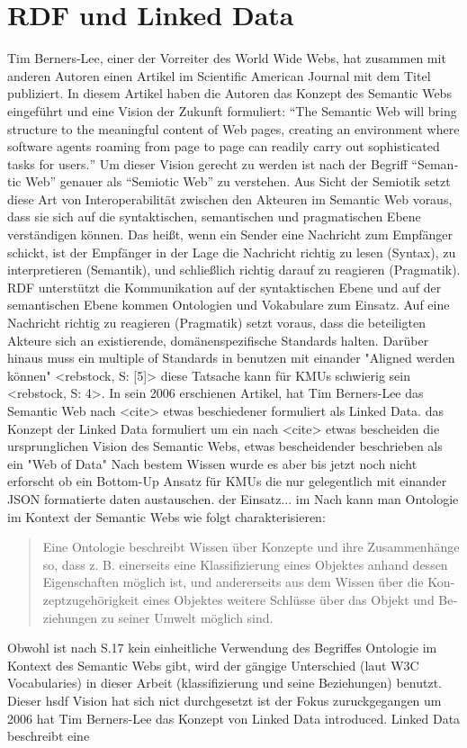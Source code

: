 \section{RDF und Linked Data}
\label{sec:linked-data}

Tim Berners-Lee, einer der Vorreiter des World Wide Webs, hat zusammen mit anderen Autoren \citeyear{berners2001semantic} einen Artikel im Scientific American Journal mit dem Titel  publiziert. In diesem Artikel haben die Autoren das Konzept des Semantic Webs eingeführt und eine Vision der Zukunft formuliert: \hyphenquote{german}{The Semantic Web will bring structure to the meaningful content of Web pages, creating an environment where software agents roaming from page to page can readily carry out sophisticated tasks for users.} Um dieser Vision gerecht zu werden ist nach \citeauthor{blumauer2006semantic} der Begriff \hyphenquote{german}{Semantic Web} genauer als \hyphenquote{german}{Semiotic Web} zu verstehen. Aus Sicht der Semiotik setzt diese Art von Interoperabilität zwischen den Akteuren im Semantic Web voraus, dass sie sich auf die syntaktischen, semantischen und pragmatischen Ebene verständigen können. Das heißt, wenn ein Sender eine Nachricht zum Empfänger schickt, ist der Empfänger in der Lage die Nachricht richtig zu lesen (Syntax), zu interpretieren (Semantik), und schließlich richtig darauf zu reagieren (Pragmatik)\parencite[vgl.]{voigtmann2002enterprise}. RDF unterstützt die Kommunikation auf der syntaktischen Ebene und auf der semantischen Ebene kommen Ontologien und Vokabulare zum Einsatz. Auf eine Nachricht richtig zu reagieren (Pragmatik) setzt voraus, dass die beteiligten Akteure sich an existierende, domänenspezifische Standards halten. Darüber hinaus muss ein multiple of Standards in benutzen mit einander "Aligned werden können" <rebstock, S: [5]> diese Tatsache kann für KMUs schwierig sein <rebstock, S: 4>. In sein 2006 erschienen Artikel, hat Tim Berners-Lee das Semantic Web nach <cite> etwas beschiedener formuliert als Linked Data. das Konzept der Linked Data formuliert um ein nach <cite> etwas bescheiden die ursprunglichen Vision des Semantic Webs, etwas bescheidender beschrieben als ein "Web of Data" Nach bestem Wissen wurde es aber bis jetzt noch nicht erforscht ob ein Bottom-Up Ansatz für KMUs die nur gelegentlich mit einander JSON formatierte daten austauschen.  der Einsatz...   im Nach \citeauthor[S.~488]{may2006semantic} kann man Ontologie im Kontext der Semantic Webs wie folgt charakterisieren: \hyphenblockquote{german}{Eine Ontologie beschreibt Wissen über Konzepte und ihre Zusammenhänge so, dass z. B. einerseits eine Klassifizierung eines Objektes anhand dessen Eigenschaften möglich ist, und andererseits aus dem Wissen über die Konzeptzugehörigkeit eines Objektes weitere Schlüsse über das Objekt und Beziehungen zu seiner Umwelt möglich sind.} Obwohl ist nach S.17 kein einheitliche Verwendung des Begriffes Ontologie im Kontext des Semantic Webs gibt, wird der gängige Unterschied (laut W3C Vocabularies) in dieser Arbeit (klassifizierung und seine Beziehungen) benutzt. Dieser hsdf Vision hat sich nict durchgesetzt ist der Fokus zuruckgegangen um 2006 hat Tim Berners-Lee das Konzept von Linked Data introduced. Linked Data beschreibt eine 